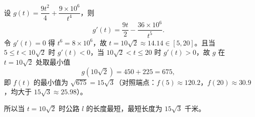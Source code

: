 \begin{answer}

设 \(g(t)=\dfrac{9t^{2}}{4}+\dfrac{9\times10^{6}}{t^{4}}\)，则
\nopagebreak[4]
\[
g'(t)=\frac{9t}{2}-\frac{36\times10^{6}}{t^{5}}.
\]
令 \(g'(t)=0\) 得 \(t^{6}=8\times10^{6}\)，故 \(t=10\sqrt{2}\approx14.14\in[5,20]\)。且当 \(5\leqslant t<10\sqrt{2}\) 时 \(g'(t)<0\)，当 \(10\sqrt{2}<t\leqslant20\) 时 \(g'(t)>0\)，故 \(g\) 在 \(t=10\sqrt{2}\) 处取最小值
\nopagebreak[4]
\[
g(10\sqrt{2})=450+225=675,
\]
即 \(f(t)\) 的最小值为 \(\sqrt{675}=15\sqrt{3}\)（对照端点：\(f(5)\approx120.2\)，\(f(20)\approx30.9\)，均大于 \(15\sqrt{3}\approx25.98\)）。

所以当 \(t=10\sqrt{2}\) 时公路 \(l\) 的长度最短，最短长度为 \(15\sqrt{3}\) 千米。



\end{answer}
